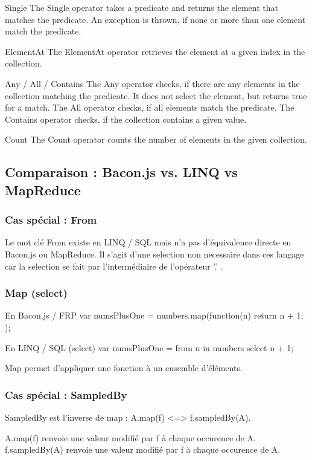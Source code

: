     Single
      The Single operator takes a predicate and returns the element that matches the predicate. An exception is thrown, if none or more than one element match the predicate.

    ElementAt
      The ElementAt operator retrieves the element at a given index in the collection.

    Any / All / Contains
      The Any operator checks, if there are any elements in the collection matching the predicate. It does not select the element, but returns true for a match. The All operator checks, if all elements match the predicate. The Contains operator checks, if the collection contains a given value.

    Count
      The Count operator counts the number of elements in the given collection. 


  \subsection{Comparaison : Bacon.js vs. LINQ vs MapReduce}

    \subsubsection{Cas spécial : From}
      Le mot clé From existe en LINQ / SQL mais n'a pas d'équivalence directe en Bacon.js ou MapReduce.
      Il s'agit d'une selection non necessaire dans ces langage car la selection se fait par l'intermédiaire de l'opérateur '.' .

    \subsubsection{Map (select)}
      En Bacon.js / FRP
        var numsPlusOne =
          numbers.map(function(n){
            return n + 1;
          });

      En LINQ / SQL (select)
        var numsPlusOne = 
          from n in numbers 
          select n + 1; 

      Map permet d'appliquer une fonction à un ensemble d'éléments.

    \subsubsection{Cas spécial : SampledBy}

      SampledBy est l'inverse de map : A.map(f) <=> f.sampledBy(A). 

      A.map(f) renvoie une valeur modifié par f à chaque occurence de A.
      f.sampledBy(A) renvoie une valeur modifié par f à chaque occurence de A.

